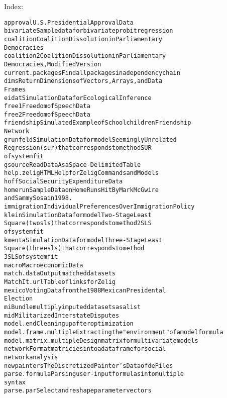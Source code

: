 \begin{Details}
Index:
\begin{alltt}
approval                U.S. Presidential Approval Data
bivariate               Sample data for bivariate probit regression
coalition               Coalition Dissolution in Parliamentary
                        Democracies
coalition2              Coalition Dissolution in Parliamentary
                        Democracies, Modified Version
current.packages        Find all packages in a dependency chain
dims                    Return Dimensions of Vectors, Arrays, and Data
                        Frames
eidat                   Simulation Data for Ecological Inference
free1                   Freedom of Speech Data
free2                   Freedom of Speech Data
friendship              Simulated Example of Schoolchildren Friendship
                        Network
grunfeld                Simulation Data for model Seemingly Unrelated
                        Regression (sur) that corresponds to method SUR
                        of systemfit
gsource                 Read Data As a Space-Delimited Table
help.zelig              HTML Help for Zelig Commands and Models
hoff                    Social Security Expenditure Data
homerun                 Sample Data on Home Runs Hit By Mark McGwire
                        and Sammy Sosa in 1998.
immigration             Individual Preferences Over Immigration Policy
klein                   Simulation Data for model Two-Stage Least
                        Square (twosls) that corresponds to method 2SLS
                        of systemfit
kmenta                  Simulation Data for model Three-Stage Least
                        Square (threesls) that corresponds to method
                        3SLS of systemfit
macro                   Macroeconomic Data
match.data              Output matched data sets
MatchIt.url             Table of links for Zelig
mexico                  Voting Data from the 1988 Mexican Presidental
                        Election
mi                      Bundle multiply imputed data sets as a list
mid                     Militarized Interstate Disputes
model.end               Cleaning up after optimization
model.frame.multiple    Extracting the "environment" of a model formula
model.matrix.multiple   Design matrix for multivariate models
network                 Format matricies into a data frame for social
                        network analysis
newpainters             The Discretized Painter's Data of de Piles
parse.formula           Parsing user-input formulas into multiple
                        syntax
parse.par               Select and reshape parameter vectors

\end{alltt}
\end{Details}
